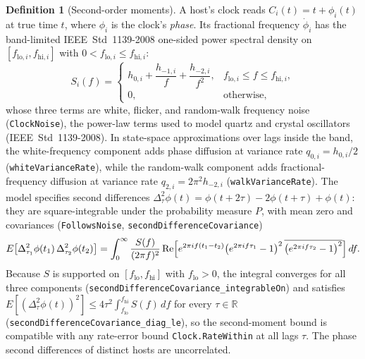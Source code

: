 \documentclass[11pt,a4paper]{article}
\newcommand{\lean}[1]{\texttt{#1}}
\newcommand{\R}{\mathbb{R}}
\theoremstyle{definition}
\newtheorem{definition}{Definition}[section]
\begin{document}
\begin{definition}[Second-order moments]
A host's clock reads $C_i(t) = t + \phi_i(t)$ at true time $t$, where
$\phi_i$ is the clock's \emph{phase}. Its fractional frequency
$\dot\phi_i$ has the band-limited IEEE~Std~1139-2008 one-sided power spectral
density on $[f_{\mathrm{lo},i}, f_{\mathrm{hi},i}]$ with
$0 < f_{\mathrm{lo},i} \le f_{\mathrm{hi},i}$:
\[
  S_i(f) =
  \begin{cases}
    h_{0,i} + \dfrac{h_{-1,i}}{f} + \dfrac{h_{-2,i}}{f^2},
      & f_{\mathrm{lo},i} \le f \le f_{\mathrm{hi},i}, \\[6pt]
    0, & \text{otherwise},
  \end{cases}
\]
whose three terms are white, flicker, and random-walk frequency noise
(\lean{ClockNoise}), the power-law terms used to model quartz and crystal
oscillators (IEEE~Std~1139-2008). In state-space approximations over lags
inside the band, the white-frequency component adds phase diffusion at variance
rate $q_{0,i} = h_{0,i}/2$ (\lean{whiteVarianceRate}), while the random-walk
component adds fractional-frequency diffusion at variance rate
$q_{2,i} = 2\pi^2 h_{-2,i}$ (\lean{walkVarianceRate}). The model specifies
second differences
$\Delta^2_\tau \phi(t) = \phi(t + 2\tau) - 2\phi(t + \tau) + \phi(t)$: they
are square-integrable under the probability measure $P$, with mean zero and
covariances (\lean{FollowsNoise}, \lean{secondDifferenceCovariance})
\[
  E\bigl[\Delta^2_{\tau_1}\phi(t_1)\,\Delta^2_{\tau_2}\phi(t_2)\bigr]
  = \int_0^\infty \frac{S(f)}{(2\pi f)^2}\,
    \mathrm{Re}\Bigl[e^{2\pi i f (t_1 - t_2)}
      \bigl(e^{2\pi i f \tau_1} - 1\bigr)^2\,
      \overline{\bigl(e^{2\pi i f \tau_2} - 1\bigr)^2}\Bigr]\,df .
\]
Because $S$ is supported on $[f_{\mathrm{lo}}, f_{\mathrm{hi}}]$ with
$f_{\mathrm{lo}} > 0$, the integral converges for all three components
(\lean{secondDifferenceCovariance\_\allowbreak integrableOn}) and satisfies
$E[(\Delta^2_\tau \phi(t))^2] \le 4\tau^2 \int_{f_{\mathrm{lo}}}^{f_{\mathrm{hi}}} S(f)\,df$
for every $\tau \in \R$
(\lean{secondDifferenceCovariance\_\allowbreak diag\_le}),
so the second-moment bound is compatible with any rate-error bound
\lean{Clock.RateWithin} at all lags $\tau$. The phase second differences of
distinct hosts are uncorrelated.


\end{definition}
\end{document}

